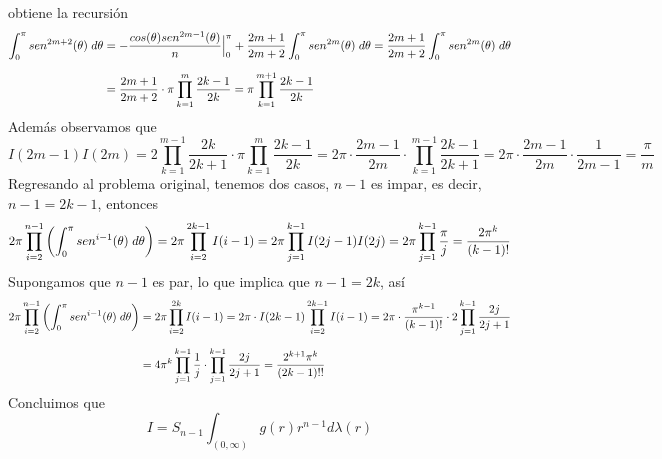 \documentclass{article}
\begin{document}
\begin{enumerate}
    obtiene la recursión
    \begin{align*}
        \int_{0}^{\pi}sen^{2m+2}(\theta)\hspace{1mm}d\theta &= 
        -\frac{cos(\theta)sen^{2m-1}(\theta)}{n}\Big|_{0}^{\pi}+\frac{2m+1}{2m+2}\int_{0}^{\pi}
        sen^{2m}(\theta)\hspace{1mm}d\theta=\frac{2m+1}{2m+2}\int_{0}^{\pi}sen^{2m}(\theta)
        \hspace{1mm}d\theta \\[2mm]
        &= \frac{2m+1}{2m+2}\cdot\pi\prod_{k=1}^{m}\frac{2k-1}{2k}
        =\pi\prod_{k=1}^{m+1}\frac{2k-1}{2k}
    \end{align*}
    Además observamos que
    \begin{equation*}
        I(2m-1)I(2m)=2\prod_{k=1}^{m-1}\frac{2k}{2k+1}\cdot\pi\prod_{k=1}^{m}\frac{2k-1}{2k}
        =2\pi\cdot\frac{2m-1}{2m}\cdot\prod_{k=1}^{m-1}\frac{2k-1}{2k+1}
        =2\pi\cdot\frac{2m-1}{2m}\cdot\frac{1}{2m-1}=\frac{\pi}{m}
    \end{equation*}
    Regresando al problema original, tenemos dos casos, $n-1$ es impar, es decir, $n-1=2k-1$, 
    entonces
    \begin{equation*}
        2\pi\prod_{i=2}^{n-1}\left(\int_{0}^{\pi}sen^{i-1}(\theta)
        \hspace{1mm}d\theta\right)
        =2\pi\prod_{i=2}^{2k-1}I(i-1)=2\pi\prod_{j=1}^{k-1}I(2j-1)I(2j)
        =2\pi\prod_{j=1}^{k-1}\frac{\pi}{j}=\frac{2\pi^{k}}{(k-1)!}
    \end{equation*}
    Supongamos que $n-1$ es par, lo que implica que $n-1=2k$, así
    \begin{align*}
        2\pi\prod_{i=2}^{n-1}\left(\int_{0}^{\pi}sen^{i-1}(\theta)
        \hspace{1mm}d\theta\right) &= 2\pi\prod_{i=2}^{2k}I(i-1)=2\pi\cdot I(2k-1)
        \prod_{i=2}^{2k-1}I(i-1)=2\pi\cdot\frac{\pi^{k-1}}{(k-1)!}
        \cdot 2\prod_{j=1}^{k-1}\frac{2j}{2j+1} \\[2mm]
        &= 4\pi^{k}\prod_{j=1}^{k-1}\frac{1}{j}\cdot\prod_{j=1}^{k-1}\frac{2j}{2j+1}
        =\frac{2^{k+1}\pi^{k}}{(2k-1)!!}
    \end{align*}
    Concluimos que
    \begin{equation*}
        I=S_{n-1}\int_{(0,\infty)}g(r)r^{n-1}d\lambda(r)
    \end{equation*}
\end{enumerate}
\end{document}
